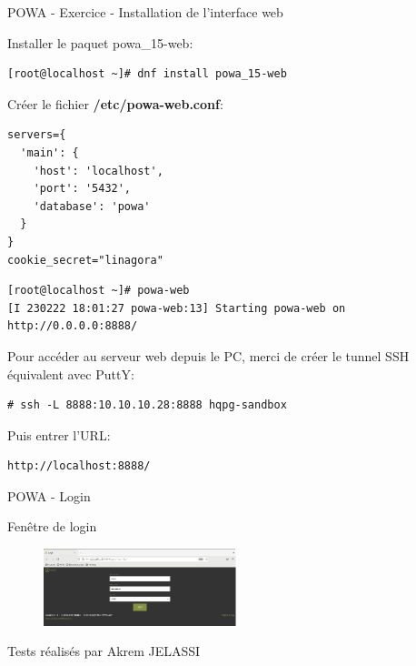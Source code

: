 \begin{frame}[fragile]{POWA - Exercice - Installation de l'interface web}

   Installer le paquet powa\_15-web:
\begin{tiny}
\begin{Verbatim}[commandchars=\&\{\}]
[root@localhost ~]# dnf install powa_15-web
\end{Verbatim}
\end{tiny}

   Créer le fichier \textbf{/etc/powa-web.conf}:
\begin{tiny}
\begin{Verbatim}[commandchars=\&\{\}]
   servers={
  'main': {
    'host': 'localhost',
    'port': '5432',
    'database': 'powa'
  }
}
cookie_secret="linagora"
\end{Verbatim}
\end{tiny}

\begin{tiny}
\begin{Verbatim}[commandchars=\&\{\}]
[root@localhost ~]# powa-web
[I 230222 18:01:27 powa-web:13] Starting powa-web on http://0.0.0.0:8888/
\end{Verbatim}
\end{tiny}

Pour accéder au serveur web depuis le PC, merci de créer le tunnel SSH équivalent avec PuttY:
\begin{tiny}
\begin{Verbatim}[commandchars=\\\{\}]
# ssh -L 8888:10.10.10.28:8888 hqpg-sandbox
\end{Verbatim}
\end{tiny}

Puis entrer l'URL:
\begin{tiny}
\begin{Verbatim}[commandchars=\\\{\}]
http://localhost:8888/
\end{Verbatim}
\end{tiny}

\end{frame}


\begin{frame}{POWA - Login}

   Fenêtre de login

\begin{figure}
\begin{center}
\includegraphics[angle=0, width=0.5\textwidth]{images/powa_login.eps}
\end{center}
\end{figure}

   Tests réalisés par Akrem JELASSI

\end{frame}


